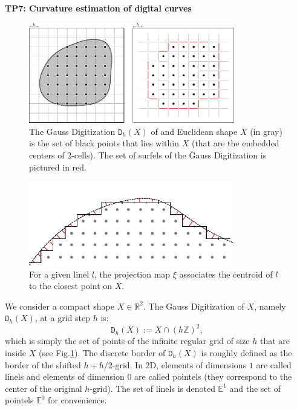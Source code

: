 \documentclass[a4paper, 11pt]{article}
\title{}
\author{}
\date{}
\begin{document}
\begin{center}
	\LARGE \textbf{TP7: Curvature estimation of digital curves}
\end{center}

\begin{figure}
  \centering
  \includegraphics[width=0.8\textwidth]{gauss}
  \caption{The Gauss Digitization $\mathtt{D}_h(X)$ of and Euclidean shape $X$ (in gray) is the set of black points that lies within $X$ (that are the embedded centers of 2-cells).
  The set of surfels of the Gauss Digitization is pictured in red. }
  \label{fig:gauss}
\end{figure}

\begin{figure}
  \centering
  \includegraphics[width=0.8\textwidth]{proj}
  \caption{For a given linel $l$, the projection map $\xi$ associates the centroid of $l$ to the closest point on $X$.}
  \label{fig:proj}
\end{figure}

We consider a compact shape $X \in \mathbb{R}^2$. The Gauss Digitization of $X$, namely $\mathtt{D}_h(X)$, at a grid step $h$ is:
\[
  \mathtt{D}_h(X) := X \cap (h\mathbb{Z})^{2},
\]
which is simply the set of points of the infinite regular grid of size $h$ that are inside $X$ (see Fig.\ref{fig:gauss}).
The discrete border of $\mathtt{D}_h(X)$ is roughly defined as the border of the shifted $h + h / 2$-grid. In 2D, elements of dimensions $1$ are called linels
and elements of dimension $0$ are called pointels (they correspond to the center of the original $h$-grid). The set of linels is denoted $\mathbb{E}^1$ and the set
of pointels $\mathbb{E}^0$ for convenience.
\end{document}
